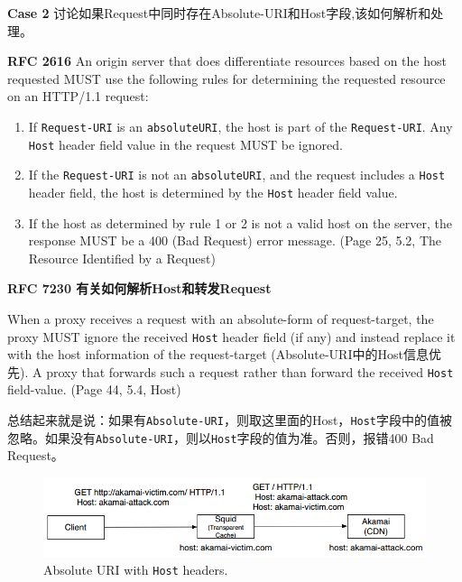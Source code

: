 \textbf{Case 2} 讨论如果Request中同时存在Absolute-URI和Host字段,该如何解析和处理。
\begin{spacing}{0.8}
	\begin{tcolorbox}
		\textbf{RFC 2616}
		An origin server that does differentiate resources based on the host requested MUST use the following rules for determining the requested resource on an HTTP/1.1 request:
		\begin{enumerate}
			\item If \texttt{Request-URI} is an \texttt{absoluteURI}, the host is part of the \texttt{Request-URI}. Any \texttt{Host} header field value in the request MUST be ignored.
			\item If the \texttt{Request-URI} is not an \texttt{absoluteURI}, and the request includes a \texttt{Host} header field, the host is determined by the \texttt{Host} header field value.
			\item If the host as determined by rule 1 or 2 is not a valid host on the server, the response MUST be a 400 (Bad Request) error message. (Page 25, 5.2, The Resource Identified by a Request)
		\end{enumerate}
	\end{tcolorbox}
\end{spacing}
\vspace{1ex}
\begin{spacing}{0.8}
	\begin{tcolorbox}
		\textbf{RFC 7230 有关如何解析Host和转发Request}
		
		When a proxy receives a request with an absolute-form of request-target, the proxy MUST ignore the received \texttt{Host} header field (if any) and instead replace it with the host information of the
		request-target (Absolute-URI中的Host信息优先). A proxy that forwards such a request {\color{red}{MUST generate a new Host field-value based on the received request-target}} rather than forward the received \texttt{Host} field-value. (Page 44, 5.4, Host)
	\end{tcolorbox}
\end{spacing}

总结起来就是说：如果有\texttt{Absolute-URI}，则取这里面的Host，\texttt{Host}字段中的值被忽略。如果没有\texttt{Absolute-URI}，则以\texttt{Host}字段的值为准。否则，报错400 Bad Request。

\begin{figure}[!htbp]
	\centering
	\includegraphics[width=1.0\linewidth]{images/AbsoluteURI_Host}
	\caption{Absolute URI with \texttt{Host} headers.}
	\label{fig:absolute-uri_host}
\end{figure}

